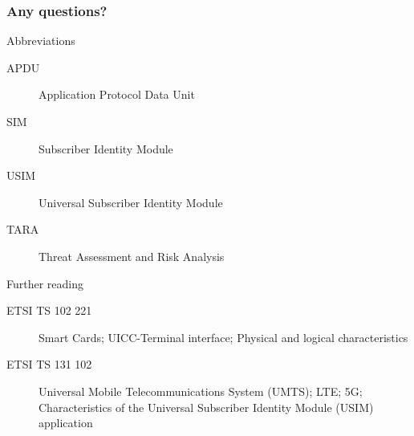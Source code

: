 \documentclass[10pt]{beamer}
\renewcommand{\section}[1]{\frametitle{#1}}
\begin{document}
    \begin{frame}
        \section{Any questions?}

        \begin{block}{Abbreviations}
            \begin{description}
                \item[APDU] Application Protocol Data Unit
				\item[SIM] Subscriber Identity Module
				\item[USIM] Universal Subscriber Identity Module
				\item[TARA] Threat Assessment and Risk Analysis
            \end{description}
        \end{block}

        \begin{block}{Further reading}
            \begin{description}
                \item[ETSI TS 102 221] Smart Cards; UICC-Terminal interface; Physical and logical characteristics
				\item[ETSI TS 131 102] Universal Mobile Telecommunications System (UMTS); LTE; 5G; Characteristics of the Universal Subscriber Identity Module (USIM) application
            \end{description}
        \end{block}
    \end{frame}
\end{document}
